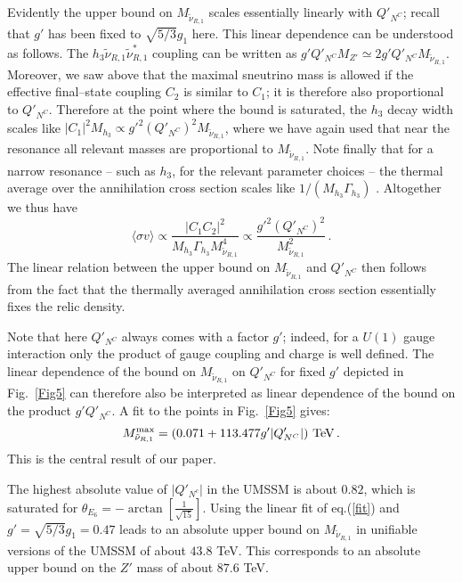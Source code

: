 \documentclass[a4paper,11pt]{article}
\begin{document}
Evidently the upper bound on $M_{\tilde \nu_{R,1}}$ scales essentially
linearly with $Q'_{N^C}$; recall that $g'$ has been fixed to
$\sqrt{5/3} g_1$ here. This linear dependence can be understood as
follows. The $h_3 \tilde \nu_{R,1} \tilde \nu_{R,1}^*$ coupling can be
written as $g' Q'_{N^C} M_{Z'} \simeq 2 g' Q'_{N^C} M_{\tilde \nu_{R,1}}$.
Moreover, we saw above that the maximal sneutrino mass is allowed if
the effective final--state coupling $C_2$ is similar to $C_1$; it is
therefore also proportional to $Q'_{N^C}$. Therefore at the point
where the bound is saturated, the $h_3$ decay width scales like
$|C_1|^2 M_{h_3} \propto g'^2 (Q'_{N^C})^2 M_{\tilde \nu_{R,1}}$,
where we have again used that near the resonance all relevant masses
are proportional to $M_{\tilde \nu_{R,1}}$. Note finally that for a
narrow resonance -- such as $h_3$, for the relevant parameter choices
-- the thermal average over the annihilation cross section scales like
$1/(M_{h_3} \Gamma_{h_3})$ \cite{Griest:1990kh}. Altogether we thus have
%
\begin{equation} \label{scaling}
\langle \sigma v \rangle \propto \frac{ |C_1 C_2|^2 } { M_{h_3}
\Gamma_{h_3} M^4_{\tilde \nu_{R,1}} }
\propto  \frac {g'^2 (Q'_{N^C})^2} {M^2_{\tilde \nu_{R,1}}} \,.
\end{equation}
%
The linear relation between the upper bound on $M_{\tilde \nu_{R,1}}$
and $Q'_{N^C}$ then follows from the fact that the thermally averaged
annihilation cross section essentially fixes the relic density.

Note that here $Q'_{N^C}$ always comes with a factor $g'$; indeed, for a
$U(1)$ gauge interaction only the product of gauge coupling and charge
is well defined. The linear dependence of the bound on $M_{\tilde \nu_{R,1}}$
on $Q'_{N^C}$ for fixed $g'$ depicted in Fig.~\ref{Fig5} can therefore also be
interpreted as linear dependence of the bound on the product $g' Q'_{N^C}$.
A fit to the points in Fig.~\ref{Fig5} gives:
%
\begin{equation} \label{fit}
M^{\rm max}_{\tilde \nu_{R,1}} = ( 0.071 + 113.477 g' |Q'_{N^C}| ) \
{\rm TeV}\,.
\end{equation}
%
This is the central result of our paper.

The highest absolute value of $|Q'_{N^{c}}|$ in the UMSSM is about
$0.82$, which is saturated for
$\theta_{E_6} = -\arctan\left[\frac{1}{\sqrt{15}}\right]$. Using the
linear fit of eq.(\ref{fit}) and $g' = \sqrt{5/3} g_1 = 0.47$ leads to
an absolute upper bound on $M_{\tilde \nu_{R,1}}$ in unifiable
versions of the UMSSM of about $43.8$ TeV. This corresponds to an
absolute upper bound on the $Z'$ mass of about $87.6$ TeV.
\end{document}
